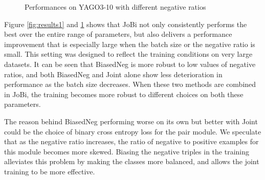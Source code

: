 \documentclass[11pt,a4paper, dvipsnames]{article}
\begin{document}
\begin{figure}[t!]
\caption{Performances on YAGO3-10 with different negative ratios} 
\label{fig:results2}
\end{figure}

Figure \ref{fig:results1} and \ref{fig:results2} shows that JoBi not only consistently performs the best over the entire range of parameters, but also delivers a performance improvement that is especially large when the batch size or the negative ratio is small. This setting was designed to reflect the training conditions on very large datasets. It can be seen that BiasedNeg is more robust to low values of negative ratios, and both BiasedNeg and Joint alone show less deterioration in performance as the batch size decreases. When these two methods are combined in JoBi, the training becomes more robust to different choices on both these parameters.

The reason behind BiasedNeg performing worse on its own but better with Joint could be the choice of binary cross entropy loss for the pair module. 
We speculate that as the negative ratio increases, the ratio of negative to positive examples for this module becomes more skewed. Biasing the negative triples in the training alleviates this problem by making the classes more balanced, and allows the joint training to be more effective.
\end{document}
